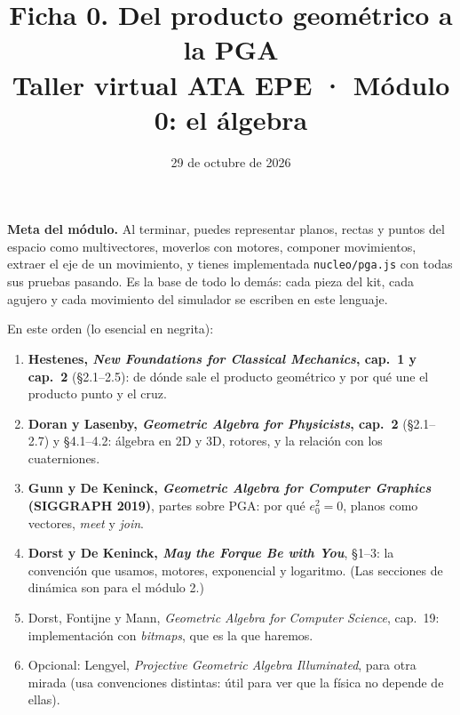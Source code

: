\documentclass[11pt,a4paper]{article}
\title{\textcolor{morado}{\textbf{Ficha 0. Del producto geométrico a la PGA}}\\[3pt]
  \large Taller virtual ATA EPE · Módulo 0: el álgebra}
\author{}
\date{29 de octubre de 2026}
\numberwithin{equation}{section}
\begin{document}
\maketitle
\vspace{-1.5em}

\begin{tcolorbox}[colback=morado,colframe=morado,coltext=white,arc=3mm]
\textbf{\textcolor{amarillo}{Meta del módulo.}} Al terminar, puedes representar planos, rectas y puntos del espacio
como multivectores, moverlos con motores, componer movimientos, extraer el eje de un movimiento, y tienes
implementada \texttt{nucleo/pga.js} con todas sus pruebas pasando. Es la base de todo lo demás: cada pieza del kit,
cada agujero y cada movimiento del simulador se escriben en este lenguaje.
\end{tcolorbox}

\begin{lectura}
En este orden (lo esencial en negrita):
\begin{enumerate}[leftmargin=*]
  \item \textbf{Hestenes, \emph{New Foundations for Classical Mechanics}, cap.~1 y cap.~2} (§2.1--2.5): de dónde sale
        el producto geométrico y por qué une el producto punto y el cruz.
  \item \textbf{Doran y Lasenby, \emph{Geometric Algebra for Physicists}, cap.~2} (§2.1--2.7) y §4.1--4.2: álgebra
        en 2D y 3D, rotores, y la relación con los cuaterniones.
  \item \textbf{Gunn y De Keninck, \emph{Geometric Algebra for Computer Graphics} (SIGGRAPH 2019)}, partes sobre PGA:
        por qué $e_0^2 = 0$, planos como vectores, \emph{meet} y \emph{join}.
  \item \textbf{Dorst y De Keninck, \emph{May the Forque Be with You}}, §1--3: la convención que usamos, motores,
        exponencial y logaritmo. (Las secciones de dinámica son para el módulo 2.)
  \item Dorst, Fontijne y Mann, \emph{Geometric Algebra for Computer Science}, cap.~19: implementación con
        \emph{bitmaps}, que es la que haremos.
  \item Opcional: Lengyel, \emph{Projective Geometric Algebra Illuminated}, para otra mirada (usa convenciones
        distintas: útil para ver que la física no depende de ellas).
\end{enumerate}
\end{lectura}

\end{document}

